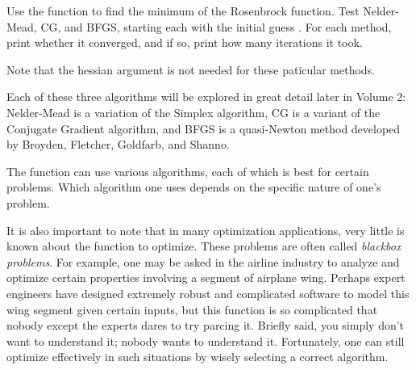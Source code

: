 \begin{problem} %
Use the  function to find the minimum of the Rosenbrock function.
Test Nelder-Mead, CG, and BFGS, starting each with the initial guess .
For each method, print whether it converged, and if so, print how many iterations it took.

Note that the hessian argument is not needed for these paticular methods. 
\end{problem}

Each of these three algorithms will be explored in great detail later in Volume 2: Nelder-Mead is a variation of the Simplex algorithm, CG is a variant of the Conjugate Gradient algorithm, and BFGS is a quasi-Newton method developed by Broyden, Fletcher, Goldfarb, and Shanno.

The  function can use various algorithms, each of which is best for certain problems.  
Which algorithm one uses depends on the specific nature of one's problem. 

It is also important to note that in many optimization applications, very little is known about the function to optimize. 
These problems are often called \emph{blackbox problems}.
For example, one may be asked in the airline industry to analyze and optimize certain properties involving a segment of airplane wing. 
Perhaps expert engineers have designed extremely robust and complicated software to model this wing segment given certain inputs, but this function is so complicated that nobody except the experts dares to try parcing it.
Briefly said, you simply don't want to understand it; nobody wants to understand it. 
Fortunately, one can still optimize effectively in such situations by wisely selecting a correct algorithm.

